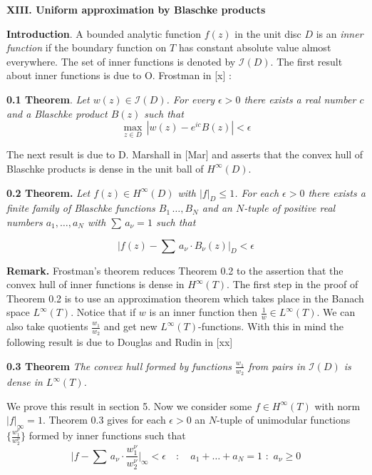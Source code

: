 \documentclass{amsart}
\begin{document}
\centerline{\bf\large {XIII. Uniform approximation by Blaschke products}}
\bigskip


\noindent
{\bf Introduction}. 
A bounded analytic function $f(z)$ in the unit disc $D$
is  an \emph{inner function} if the boundary function
on $T$ has constant absolute value  almost everywhere.
The set of inner functions is denoted by $\mathcal I(D)$.
The first result about inner functions
is due to O. Frostman in [x] :
\medskip
  
\noindent

\noindent
{\bf 0.1 Theorem}. \emph{Let $w(z)\in\mathcal I(D)$. For every
$\epsilon>0$ there exists a real number $c$ and a Blaschke product
$B(z)$ such that}
\[
\max_{z\in D}\,|w(z)-e^{ic}B(z)|<\epsilon
\]
\medskip

\noindent
The next result is due to D. Marshall in [Mar] and asserts that
the convex hull of Blaschke products is dense in the unit ball of
$H^\infty(D)$.
\bigskip

\noindent
{\bf 0.2 Theorem.}
\emph{Let $f(z)\in H^\infty(D)$ with $|f|_D\leq 1$. For each $\epsilon>0$ there exists
a finite family  of Blaschke functions
$B_1\,\ldots,B_N$ and
an $N$-tuple of positive real numbers
$a_1,\ldots,a_N$ with $\sum\, a_\nu=1$ such that}

\[
\bigl |f(z)-\sum\,a_\nu\cdot B_\nu(z)\bigr |_D<\epsilon
\]


\medskip

\noindent
{\bf Remark.}
Frostman's theorem reduces Theorem 0.2  to the assertion
that the  convex hull of inner functions is dense in
$H^\infty(T)$. 
The first step in the proof of Theorem 0.2 is to use
an approximation theorem which takes place in
the Banach space $L^\infty(T)$.
Notice that if
$w$ is an inner function then $\frac{1}{w}\in L^\infty(T)$.
We can also take quotients $\frac{w_1}{w_2}$
and get new $L^\infty(T)$-functions.
With this in mind  the following result  is due to
Douglas and Rudin in [xx]
\medskip

\noindent
{\bf 0.3 Theorem} \emph{The convex hull formed by
functions $\frac{w_1}{w_2}$ from pairs in
$\mathcal I(D)$ is dense in $L^\infty(T)$.}

\bigskip

\noindent
We prove this result in section 5.
Now we consider some  $f\in H^\infty(T)$ with
norm $|f|_\infty=1$. 
Theorem 0.3 gives for each
$\epsilon>0$ an
$N$-tuple of unimodular functions
$\{\frac{w_1^\nu}{w_2^\nu}\}$ formed by inner functions 
such that
\[
\bigl |f-
\sum\, a_\nu\cdot \frac{w_1^\nu}{w_2^\nu}\bigr |_\infty
<\epsilon\quad\colon\quad
a_1+\ldots+a_N=1\,\,\colon\,\, a_\nu\geq 0\tag{*}
\]
\end{document}
